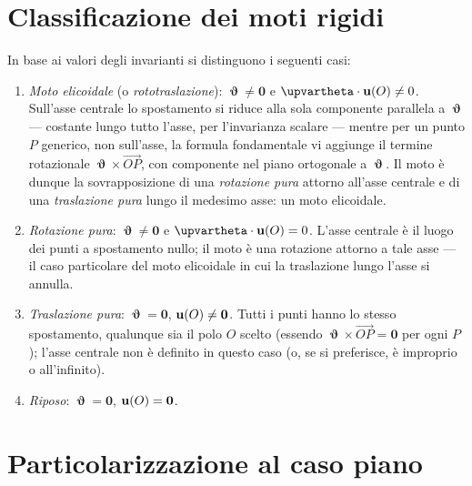 \section{Classificazione dei moti rigidi}
In base ai valori degli invarianti si distinguono i seguenti
casi:
\begin{enumerate}[label=(\roman*)]
	\item \textit{Moto elicoidale} (o \textit{rototraslazione}):
	$\bm{\upvartheta} \neq \mathbf 0$ e
	$\bm{\upvartheta} \cdot \ub(O) \neq 0$. Sull'asse centrale
	lo spostamento si riduce alla sola componente parallela a
	$\bm{\upvartheta}$ — costante lungo tutto l'asse, per
	l'invarianza scalare — mentre per un punto $P$ generico, non
	sull'asse, la formula fondamentale vi aggiunge il termine
	rotazionale $\bm{\upvartheta}\times\overrightarrow{OP}$, con
	componente nel piano ortogonale a $\bm{\upvartheta}$. Il
	moto è dunque la sovrapposizione di una \textit{rotazione
		pura} attorno all'asse centrale e di una \textit{traslazione
		pura} lungo il medesimo asse: un moto elicoidale.
	\item \textit{Rotazione pura}:
	$\bm{\upvartheta} \neq \mathbf 0$ e
	$\bm{\upvartheta} \cdot \ub(O) = 0$. L'asse centrale è il
	luogo dei punti a spostamento nullo; il moto è una rotazione
	attorno a tale asse — il caso particolare del moto elicoidale
	in cui la traslazione lungo l'asse si annulla.
	\item \textit{Traslazione pura}:
	$\bm{\upvartheta} = \mathbf 0$, $\mathbf{u}(O) \neq \mathbf 0$.
	Tutti i punti hanno lo stesso spostamento, qualunque sia il
	polo $O$ scelto (essendo $\bm{\upvartheta}\times\overrightarrow{OP}=\mathbf 0$
	per ogni $P$); l'asse centrale non è definito in questo caso
	(o, se si preferisce, è improprio o all'infinito).
	\item \textit{Riposo}: $\bm{\upvartheta} = \mathbf 0$,
	$\mathbf{u}(O) = \mathbf 0$.
\end{enumerate}






\section{Particolarizzazione al caso piano}\label{sec:caso_piano}

